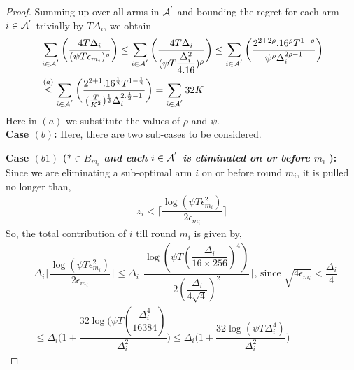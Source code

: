\begin{proof}
Summing up over all arms in $\mathcal{A}^{'}$ and bounding the regret for each arm $i\in \mathcal{A}^{'}$ trivially by $T\Delta_{i}$, we obtain
   \begin{align*}
&\sum_{i\in \mathcal{A}^{'}}\bigg(\dfrac{4T\Delta_{i}}{(\psi T\epsilon_{m_{i}})^{\rho}}\bigg)
\leq\sum_{i\in \mathcal{A}^{'}}\bigg(\dfrac{4T\Delta_{i}}{(\psi T\dfrac{\Delta_{i}^{2}}{4.16})^{\rho}}\bigg)
\leq \sum_{i\in \mathcal{A}^{'}}\bigg(\dfrac{2^{2+2\rho}.16^{\rho}T^{1-\rho}}{\psi^{\rho}\Delta_{i}^{2\rho -1}}\bigg)\\  
& \overset{(a)}{\leq} \sum_{i\in \mathcal{A}^{'}}\bigg(\dfrac{2^{2+1}.16^{\frac{1}{2}}T^{1-\frac{1}{2}}}{(\frac{T}{K^2})^{\frac{1}{2}}\Delta_{i}^{2.\frac{1}{2} -1}}\bigg) = \sum_{i\in \mathcal{A}^{'}}  32 K  
   \end{align*}
   Here in $(a)$ we substitute the values of $\rho$ and $\psi$.\\

\textbf{Case $(b)$:} Here, there are two sub-cases to be considered.

\noindent
\textbf{Case $(b1)$ (\textit{${*}\in B_{m_{i}}$ and each ${i}\in \mathcal{A}^{'}$ is  eliminated on or before $m_{i}$ }): } Since we are eliminating a sub-optimal arm ${i}$ on or before round $m_{i}$, it is pulled no longer than, 
 \begin{align*}
 z_{i} < \bigg\lceil\dfrac{\log{(\psi T\epsilon_{m_{i}}^{2})}}{2\epsilon_{m_{i}}}\bigg\rceil
 \end{align*}
So, the total contribution of ${i}$  till round $m_{i}$ is given by, 
\begin{align*}
&\Delta_{i}\bigg\lceil\dfrac{\log{(\psi T\epsilon_{m_{i}}^{2})}}{2\epsilon_{m_{i}}}\bigg\rceil
\leq\Delta_{i}\bigg\lceil\dfrac{\log{(\psi T(\dfrac{\Delta_{i}}{16 \times 256})^{4})}}{2(\dfrac{\Delta_{i}}{4\sqrt{4}})^{2}}\bigg\rceil \text{, since } \sqrt{4\epsilon_{m_{i}}} < \dfrac{\Delta_{i}}{4}\\
&\leq\Delta_{i}\bigg(1+\dfrac{32\log{(\psi T(\dfrac{\Delta_{i}^{4}}{16384})}}{\Delta_{i}^{2}}\bigg)
\leq \Delta_{i}\bigg(1+\dfrac{32\log{(\psi T\Delta_{i}^{4})}}{\Delta_{i}^{2}}\bigg) 
\end{align*} 


\end{proof}
